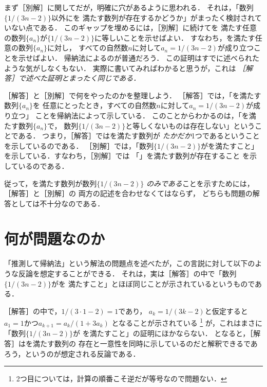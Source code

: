\documentclass[11pt,a4paper]{ltjsarticle} %
\theoremstyle{mystyle} %
\begin{document}
まず［別解］に関してだが，明確に穴があるように思われる．
それは，「数列$\{ 1/(3n-2) \}$以外にを
満たす数列が存在するかどうか」がまったく検討されていない点である．
このギャップを埋めるには，［別解］に続けてを
満たす任意の数列$\{ a_n \}$が$\{ 1/(3n-2) \}$に等しいことを示せばよい．
すなわち，を満たす任意の数列$\{a_n \}$に対し，
すべての自然数$n$に対して$a_n = 1/(3n-2)$が成り立つことを示せばよい．
帰納法によるのが普通だろう．
この証明はすでに述べられたような気がしなくもない．
実際に書いてみればわかると思うが，これは
\emph{［解答］で述べた証明とまったく同じである．}


［解答］と［別解］で何をやったのかを整理しよう．
［解答］では，「を満たす数列$\{ a_n \}$を
任意にとったとき，すべての自然数$n$に対して$a_n = 1/(3n-2)$が成り立つ」
ことを帰納法によって示している．
このことからわかるのは，「を満たす数列$\{ a_n \}$で，
数列$\{ 1/(3n-2) \}$と等しくないものは存在しない」ということである．
つまり，［解答］ではを満たす数列が
\emph{たかだか}1つであるということを示しているのである．
［別解］では，「数列$\{ 1/(3n-2) \}$がを満たすこと」
を示している．すなわち，［別解］では
「」を満たす数列が存在すること
を示しているのである．

従って，を満たす数列が数列$\{ 1/(3n-2) \}$
\emph{のみである}ことを示すためには，［解答］と［別解］の
両方の記述を合わせなくてはならず，
どちらも問題の解答としては不十分なのである．


\section{何が問題なのか}
「推測して帰納法」という解法の問題点を述べたが，この言説に対して以下のような反論を想定することができる．
それは，実は［解答］の中で「数列$\{ 1/(3n-2) \}$がを
満たすこと」とほぼ同じことが示されているというものである．

［解答］の中で，$1/(3 \cdot 1 -2) =1$であり，
$a_k = 1/(3k-2)$と仮定すると$a_1=1$かつ$a_{k+1} = a_k/(1+3a_k)$
となることが示されている
\footnote{
	2つ目については，計算の順番こそ逆だが等号なので問題ない．
}
が，これはまさに「数列$\{ 1/(3n-2) \}$が
を満たすこと」の証明にほかならない．
となると，［解答］はを満たす数列の
存在と一意性を同時に示しているのだと解釈できるであろう，というのが想定される反論である．
\end{document}
